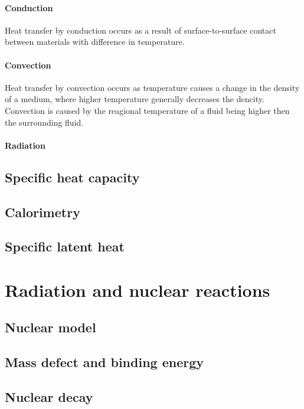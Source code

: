 \documentclass{book}
\begin{document}
\subsubsection{Conduction}
Heat transfer by conduction occurs as a result of surface-to-surface contact between materials with difference in temperature.

\subsubsection{Convection}
Heat transfer by convection occurs as temperature causes a change in the density of a medium, where higher temperature generally decreases the dencity.  Convection is caused by the reagional temperature of a fluid being higher then the surrounding fluid.

\subsubsection{Radiation}


\section{Specific heat capacity}


\section{Calorimetry}


\section{Specific latent heat}



\chapter{Radiation and nuclear reactions}
\section{Nuclear model}


\section{Mass defect and binding energy}


\section{Nuclear decay}
\end{document}
